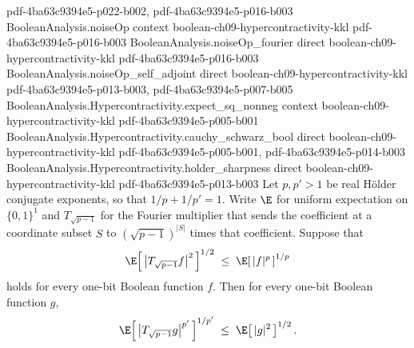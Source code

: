 \begin{theorem}
  {pdf-4ba63c9394e5-p022-b002,
    pdf-4ba63c9394e5-p016-b003}
\proofstep
  {BooleanAnalysis.noiseOp}
  {context}
  {boolean-ch09-hypercontractivity-kkl}
  {pdf-4ba63c9394e5-p016-b003}
\proofstep
  {BooleanAnalysis.noiseOp_fourier}
  {direct}
  {boolean-ch09-hypercontractivity-kkl}
  {pdf-4ba63c9394e5-p016-b003}
\proofstep
  {BooleanAnalysis.noiseOp_self_adjoint}
  {direct}
  {boolean-ch09-hypercontractivity-kkl}
  {pdf-4ba63c9394e5-p013-b003,
    pdf-4ba63c9394e5-p007-b005}
\proofstep
  {BooleanAnalysis.Hypercontractivity.expect_sq_nonneg}
  {context}
  {boolean-ch09-hypercontractivity-kkl}
  {pdf-4ba63c9394e5-p005-b001}
\proofstep
  {BooleanAnalysis.Hypercontractivity.cauchy_schwarz_bool}
  {direct}
  {boolean-ch09-hypercontractivity-kkl}
  {pdf-4ba63c9394e5-p005-b001,
    pdf-4ba63c9394e5-p014-b003}
\proofstep
  {BooleanAnalysis.Hypercontractivity.holder_sharpness}
  {direct}
  {boolean-ch09-hypercontractivity-kkl}
  {pdf-4ba63c9394e5-p013-b003}
Let $p,p'>1$ be real Hölder conjugate exponents, so that $1/p + 1/p' = 1$.
Write $\E$ for uniform expectation on $\{0,1\}^1$ and $T_{\sqrt{p-1}}$ for the
Fourier multiplier that sends the coefficient at a coordinate subset $S$ to
$(\sqrt{p-1})^{|S|}$ times that coefficient. Suppose that
\[
\E\!\left[\,\bigl|T_{\sqrt{p-1}} f\bigr|^{2}\,\right]^{1/2} \;\le\;
\E\!\left[\,|f|^{p}\,\right]^{1/p}
\]
holds for every one-bit Boolean function $f$. Then for every one-bit Boolean function
$g$,
\[
\E\!\left[\,\bigl|T_{\sqrt{p-1}} g\bigr|^{p'}\,\right]^{1/p'} \;\le\;
\E\!\left[\,|g|^{2}\,\right]^{1/2}.
\]
\end{theorem}

